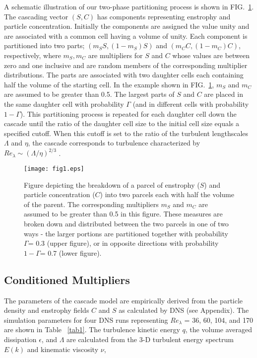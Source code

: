 \documentclass[aps,pra,twocolumn,groupedaddress,showkeys,showpacs,floatfix]{revtex4}
\begin{document}
A schematic illustration of our two-phase partitioning process is shown in 
FIG.~\ref{fig1}. The cascading vector $(S,C)$ has components representing enstrophy
and  particle concentration. Initially the components are assigned the value
unity  and are associated with a common cell having a volume of unity. Each
component   is partitioned into two parts;  $(m_{S}S, (1-m_{S})S)$ and
$(m_{C}C, (1-m_{C})C)$, respectively, where $m_{S}, m_{C}$ are multipliers for $S$ and $C$
whose values are   between zero and one inclusive and are random members of 
 the corresponding multiplier distributions. The parts are associated with two
daughter cells each containing half the volume of the starting cell.   In the example
shown in FIG.~\ref{fig1},
$m_{S}$ and $m_{C}$ are assumed to be greater than 0.5.   The largest parts of
$S$ and $C$ are placed in the same daughter cell with probability $\Gamma$  (and in
different cells with probability $1-\Gamma$).   This partitioning process is
repeated for each daughter cell down the cascade until the ratio of the
daughter cell size to the   initial cell size equals a specified cutoff. When
this cutoff is set to the   ratio of the turbulent lengthscales $\Lambda$ and 
$\eta$, the   cascade corresponds to turbulence characterized by
$Re_{\lambda} \sim (\Lambda / \eta)^{2/3}$ \cite{Frisch:1}.
   



\begin{figure}[h]
\begin{center}
\texttt{[image: fig1.eps]}
\caption{\label{fig1}Figure depicting the breakdown of a parcel of enstrophy ($S$) and     
particle concentration ($C$) into two parcels each with half the volume of     
the parent.      The corresponding multipliers $m_{S}$ and $m_{C}$ are
assumed to be greater than 0.5 in this figure. These measures are broken down
and distributed      between the two parcels in one of two ways - the larger
portions are partitioned together with probability $\Gamma$= 0.3      (upper
figure), or in opposite directions with probability $1-\Gamma$= 0.7 (lower
figure). }
\end{center}
\end{figure}

\subsection{ Conditioned Multipliers }

The parameters of the cascade model are empirically derived from    the
particle density and enstrophy fields $C$ and $S$ as calculated by DNS (see Appendix). 
The simulation parameters for four DNS runs representing   
$Re_\lambda$ =  36, 60, 104, and 170 are shown in Table ~\ref{tab1}.
The turbulence kinetic energy $q$, the volume averaged dissipation $\epsilon$, and $\Lambda$ 
are calculated from the 3-D turbulent energy spectrum $E(k)$ and kinematic viscosity $\nu$,
\end{document}
